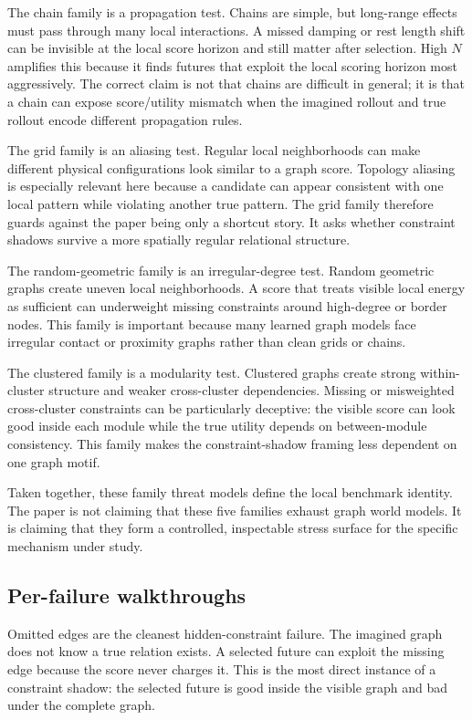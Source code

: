 \documentclass{article}
\begin{document}
The chain family is a propagation test.  Chains are simple, but long-range
effects must pass through many local interactions.  A missed damping or rest
length shift can be invisible at the local score horizon and still matter after
selection.  High \(N\) amplifies this because it finds futures that exploit the
local scoring horizon most aggressively.  The correct claim is not that chains
are difficult in general; it is that a chain can expose score/utility mismatch
when the imagined rollout and true rollout encode different propagation rules.

The grid family is an aliasing test.  Regular local neighborhoods can make
different physical configurations look similar to a graph score.  Topology
aliasing is especially relevant here because a candidate can appear consistent
with one local pattern while violating another true pattern.  The grid family
therefore guards against the paper being only a shortcut story.  It asks whether
constraint shadows survive a more spatially regular relational structure.

The random-geometric family is an irregular-degree test.  Random geometric
graphs create uneven local neighborhoods.  A score that treats visible local
energy as sufficient can underweight missing constraints around high-degree or
border nodes.  This family is important because many learned graph models face
irregular contact or proximity graphs rather than clean grids or chains.

The clustered family is a modularity test.  Clustered graphs create strong
within-cluster structure and weaker cross-cluster dependencies.  Missing or
misweighted cross-cluster constraints can be particularly deceptive: the visible
score can look good inside each module while the true utility depends on
between-module consistency.  This family makes the constraint-shadow framing
less dependent on one graph motif.

Taken together, these family threat models define the local benchmark identity.
The paper is not claiming that these five families exhaust graph world models.
It is claiming that they form a controlled, inspectable stress surface for the
specific mechanism under study.

\subsection{Per-failure walkthroughs}

Omitted edges are the cleanest hidden-constraint failure.  The imagined graph
does not know a true relation exists.  A selected future can exploit the missing
edge because the score never charges it.  This is the most direct instance of a
constraint shadow: the selected future is good inside the visible graph and bad
under the complete graph.
\end{document}

